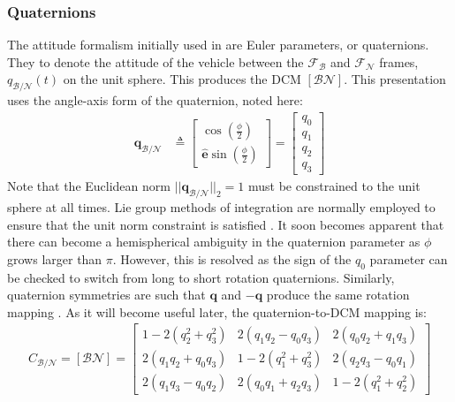 \documentclass[conf]{new-aiaa}
\begin{document}
\subsubsection{Quaternions}
The attitude formalism initially used in \cite{szmuk2017successive} are Euler parameters, or quaternions. They to denote the attitude of the vehicle between the $\mathcal{F}_\mathcal{B}$ and $\mathcal{F}_\mathcal{N}$ frames, $q_{\mathcal{B}/\mathcal{N}}(t)$ on the unit sphere. This produces the DCM $[\mathcal{B}\mathcal{N}]$. This presentation uses the angle-axis form of the quaternion, noted here:
% 
\begin{align}
	\bm{q}_{\mathcal{B}/\mathcal{N}} &\triangleq
	\begin{bmatrix}
	\cos(\frac{\phi}{2}) \\
	\hat{\bm{e}}\sin(\frac{\phi}{2})
	\end{bmatrix}
	= 
	\begin{bmatrix}
	q_0 \\ q_1 \\ q_2 \\ q_3
	\end{bmatrix}
\end{align}
%
Note that the Euclidean norm $\lvert \lvert {\bm{q}_{\mathcal{B}/\mathcal{N}}} \rvert \rvert_2 = 1$ must be constrained to the unit sphere at all times. Lie group methods of integration are normally employed to ensure that the unit norm constraint is satisfied \cite{andrle2013geometric}. It soon becomes apparent that there can become a hemispherical ambiguity in the quaternion parameter as $\phi$ grows larger than $\pi$. However, this is resolved as the sign of the $q_0$ parameter can be checked to switch from long to short rotation quaternions. Similarly, quaternion symmetries are such that $\bm{q}$ and $-\bm{q}$ produce the same rotation mapping \cite{sj}. As it will become useful later, the quaternion-to-DCM mapping is:
% 
\begin{align}
\label{q2C}
C_{\mathcal{B}/\mathcal{N}} = [\mathcal{B}\mathcal{N}]={\begin{bmatrix}1-2(q_{2}^{2}+q_{3}^{2})&2(q_{1}q_{2}-q_{0}q_{3})&2(q_{0}q_{2}+q_{1}q_{3})\\2(q_{1}q_{2}+q_{0}q_{3})&1-2(q_{1}^{2}+q_{3}^{2})&2(q_{2}q_{3}-q_{0}q_{1})\\2(q_{1}q_{3}-q_{0}q_{2})&2(q_{0}q_{1}+q_{2}q_{3})&1-2(q_{1}^{2}+q_{2}^{2})\end{bmatrix}}
\end{align}
\end{document}
